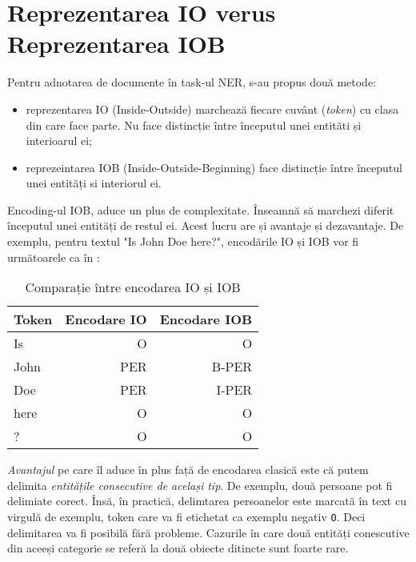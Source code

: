 

\section{Reprezentarea IO verus Reprezentarea IOB}
\label{sec:io-encoding}

Pentru adnotarea de documente în task-ul NER, s-au propus două metode:

\begin{itemize}
\item reprezentarea IO (Inside-Outside) marchează fiecare cuvânt (\textit{token}) cu clasa din care face parte. Nu face distincție între începutul unei entităti și interioarul ei;
\item reprezeintarea IOB (Inside-Outside-Beginning) face distincție între începutul unei entități si interiorul ei.
\end{itemize}

Encoding-ul IOB,  aduce un plus de complexitate. Înseamnă să marchezi diferit începutul unei entități de restul ei. Acest lucru are și avantaje și dezavantaje. De exemplu, pentru textul "Is John Doe here?", encodările IO și IOB vor fi următoarele ca în :


\begin{center}
\begin{table}[hb]
\caption{Comparație între encodarea IO și IOB}
\begin{tabular}{ |l | r | r |}
\hline
  Token & Encodare IO & Encodare IOB \\
\hline
  Is & O & O \\
  John & PER & B-PER  \\
  Doe & PER & I-PER \\
  here & O & O \\
  ? & O & O \\
  \hline
\end{tabular}
 \label{table:iob-encoding}
\end{table}
\end{center}


\textit{Avantajul} pe care îl aduce în plus față de encodarea clasică este că putem delimita  \textit{entitățile consecutive de același tip}. De exemplu, două persoane pot fi delimiate corect. Însă, în practică, delimtarea persoanelor este marcată în text cu virgulă de exemplu, token care va fi etichetat ca exemplu negativ \texttt{O}. Deci delimitarea va fi posibilă fără probleme. Cazurile în care două entități conescutive din aceeși categorie se referă la două obiecte ditincte sunt foarte rare.

